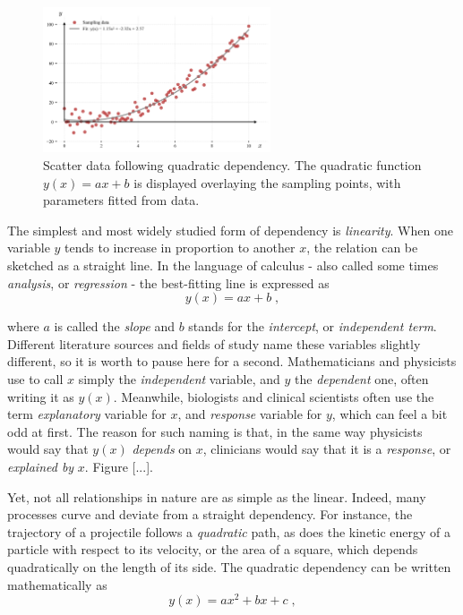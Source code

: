 \documentclass{book}
\begin{document}
\begin{figure}[ht]
    \centering
    \includegraphics[width=0.6\textwidth]{figures/chapter1/quadratic1.png}
    \caption{Scatter data following quadratic dependency. The quadratic function $y(x) = a x + b$ is displayed overlaying the sampling points, with parameters fitted from data.}
    \label{fig:quadratic1}
\end{figure}

The simplest and most widely studied form of dependency is \textit{linearity}. When one variable $y$ tends to increase in proportion to another $x$, the relation can be sketched as a straight line. In the language of calculus - also called some times \textit{analysis}, or \textit{regression} - the best-fitting line is expressed as
\begin{equation}
	y(x) = a x + b \; ,
	\label{eq:linear}
\end{equation}

where $a$ is called the \textit{slope} and $b$ stands for the \textit{intercept}, or \textit{independent term}. Different literature sources and fields of study name these variables slightly different, so it is worth to pause here for a second. Mathematicians and physicists use to call $x$ simply the \textit{independent} variable, and $y$ the \textit{dependent} one, often writing it as $y(x)$. Meanwhile, biologists and clinical scientists often use the term \textit{explanatory} variable for $x$, and \textit{response} variable for $y$, which can feel a bit odd at first. The reason for such naming is that, in the same way physicists would say that $y(x)$ \textit{depends} on $x$, clinicians would say that it is a \textit{response}, or \textit{explained by} $x$. Figure [...].

\medskip

Yet, not all relationships in nature are as simple as the linear. Indeed, many processes curve and deviate from a straight dependency. For instance, the trajectory of a projectile follows a \textit{quadratic} path, as does the kinetic energy of a particle with respect to its velocity, or the area of a square, which depends quadratically on the length of its side. The quadratic dependency can be written mathematically as
\begin{equation}
	y(x) = a x^2 + b x + c \; ,
	\label{eq:quadratic}
\end{equation}
\end{document}
